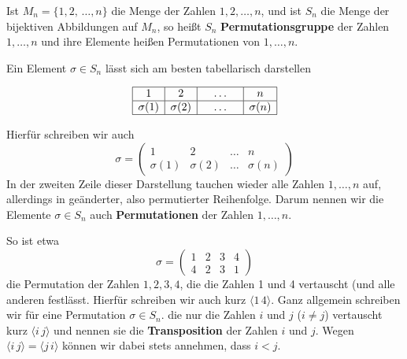 \begin{beispiel}\label{gruppe_permutation} 
Ist $M_n = \{1, 2, \, \ldots , n \}$ die Menge der Zahlen $1, 2, \ldots, n$, und ist $S_n$ die Menge der 
bijektiven Abbildungen auf $M_n$, so heißt 
$S_n$ \textbf{Permutationsgruppe} der Zahlen $1,  
\ldots, n$ und ihre Elemente heißen Permutationen von $1, \ldots, n$. 

Ein Element $\sigma \in S_n$ lässt sich am besten tabellarisch darstellen

\medbreak

	$$ \begin{array}{ | c | c | c | c | }
	\hline
	1 & 2 & \quad \ldots \quad & n  \\
	\hline
	\sigma(1) & \sigma(2) & \quad \ldots  \quad & \sigma(n)  \\
	\hline
	\end{array} $$


\medbreak

Hierfür schreiben wir auch 
  	$$ \sigma = \left( \begin{matrix} 1 & 2 & \ldots & n \\ \sigma(1) & \sigma(2) & \ldots & \sigma(n) 
   	\end{matrix} \right) $$
In der zweiten Zeile dieser Darstellung tauchen wieder alle Zahlen $1, \ldots, n$ auf, allerdings in 
geänderter, also permutierter Reihenfolge. Darum nennen wir die Elemente $\sigma \in S_n$ auch 
\textbf{Permutationen} der Zahlen $1, \ldots, n$.

So ist etwa 
  	$$ \sigma = \left(\begin{matrix} 1 & 2 & 3 & 4 \\ 4 & 2 & 3 & 1 \end{matrix} \right) $$
die Permutation der Zahlen $1, 2, 3, 4$, die die Zahlen 1 und 4 vertauscht (und alle anderen festlässt. 
Hierfür schreiben wir auch kurz $\langle 1 \, 4 \rangle$. Ganz allgemein schreiben wir für eine 
Permutation $\sigma \in S_n$. die nur die Zahlen $i$ und $j$ ($i \neq j$) vertauscht kurz
$\langle i \, j \rangle$ und nennen sie die \textbf{Transposition} 
der Zahlen 
$i$ und $j$. Wegen $\langle i \, j \rangle =  \langle j \, i \rangle$ können wir dabei stets annehmen, 
dass $i < j$.


\end{beispiel}

